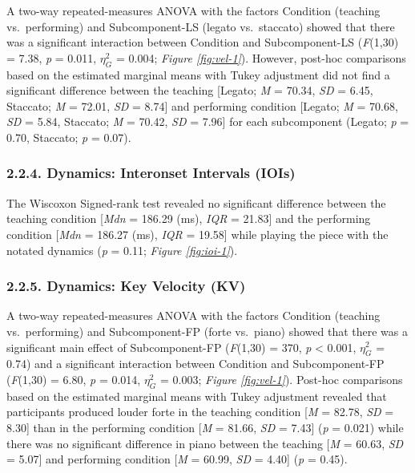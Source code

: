 \documentclass[
  english,
  man,floatsintext]{apa6}
\begin{document}
A two-way repeated-measures ANOVA with the factors Condition (teaching vs.~performing) and Subcomponent-LS (legato vs.~staccato) showed that there was a significant interaction between Condition and Subcomponent-LS (\emph{F}(1,30) = 7.38, \emph{p} = 0.011, \(\eta_G^2\) = 0.004; \emph{Figure \ref{fig:vel-1}}). However, post-hoc comparisons based on the estimated marginal means with Tukey adjustment did not find a significant difference between the teaching {[}Legato; \emph{M} = 70.34, \emph{SD} = 6.45, Staccato; \emph{M} = 72.01, \emph{SD} = 8.74{]} and performing condition {[}Legato; \emph{M} = 70.68, \emph{SD} = 5.84, Staccato; \emph{M} = 70.42, \emph{SD} = 7.96{]} for each subcomponent (Legato; \emph{p} = 0.70, Staccato; \emph{p} = 0.07).

\hypertarget{dynamics-interonset-intervals-iois}{%
\subsubsection{2.2.4. Dynamics: Interonset Intervals (IOIs)}\label{dynamics-interonset-intervals-iois}}

The Wiscoxon Signed-rank test revealed no significant difference between the teaching condition {[}\emph{Mdn} = 186.29 (ms), \emph{IQR} = 21.83{]} and the performing condition {[}\emph{Mdn} = 186.27 (ms), \emph{IQR} = 19.58{]} while playing the piece with the notated dynamics (\emph{p} = 0.11; \emph{Figure \ref{fig:ioi-1}}).

\hypertarget{dynamics-key-velocity-kv}{%
\subsubsection{2.2.5. Dynamics: Key Velocity (KV)}\label{dynamics-key-velocity-kv}}

A two-way repeated-measures ANOVA with the factors Condition (teaching vs.~performing) and Subcomponent-FP (forte vs.~piano) showed that there was a significant main effect of Subcomponent-FP (\emph{F}(1,30) = 370, \emph{p} \textless{} 0.001, \(\eta_G^2\) = 0.74) and a significant interaction between Condition and Subcomponent-FP (\emph{F}(1,30) = 6.80, \emph{p} = 0.014, \(\eta_G^2\) = 0.003; \emph{Figure \ref{fig:vel-1}}). Post-hoc comparisons based on the estimated marginal means with Tukey adjustment revealed that participants produced louder forte in the teaching condition {[}\emph{M} = 82.78, \emph{SD} = 8.30{]} than in the performing condition {[}\emph{M} = 81.66, \emph{SD} = 7.43{]} (\emph{p} = 0.021) while there was no significant difference in piano between the teaching {[}\emph{M} = 60.63, \emph{SD} = 5.07{]} and performing condition {[}\emph{M} = 60.99, \emph{SD} = 4.40{]} (\emph{p} = 0.45).
\end{document}

